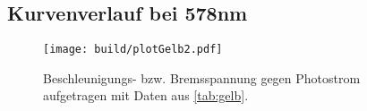 

\subsection{Kurvenverlauf bei 578nm}

\begin{figure}[H]
  \centering
  \texttt{[image: build/plotGelb2.pdf]}
  \caption{Beschleunigungs- bzw. Bremsspannung gegen Photostrom aufgetragen mit Daten aus \autoref{tab:gelb}.}
  \label{fig:gelb2}
\end{figure}

